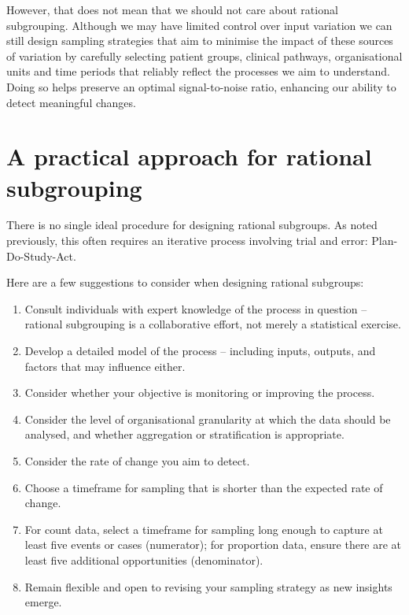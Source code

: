 \documentclass[
]{book}
\begin{document}
However, that does not mean that we should not care about rational subgrouping. Although we may have limited control over input variation we can still design sampling strategies that aim to minimise the impact of these sources of variation by carefully selecting patient groups, clinical pathways, organisational units and time periods that reliably reflect the processes we aim to understand. Doing so helps preserve an optimal signal-to-noise ratio, enhancing our ability to detect meaningful changes.

\section{A practical approach for rational subgrouping}\label{a-practical-approach-for-rational-subgrouping}

There is no single ideal procedure for designing rational subgroups. As noted previously, this often requires an iterative process involving trial and error: Plan-Do-Study-Act.

Here are a few suggestions to consider when designing rational subgroups:

\begin{enumerate}
\def\labelenumi{\arabic{enumi}.}
\item
  Consult individuals with expert knowledge of the process in question -- rational subgrouping is a collaborative effort, not merely a statistical exercise.
\item
  Develop a detailed model of the process -- including inputs, outputs, and factors that may influence either.
\item
  Consider whether your objective is monitoring or improving the process.
\item
  Consider the level of organisational granularity at which the data should be analysed, and whether aggregation or stratification is appropriate.
\item
  Consider the rate of change you aim to detect.
\item
  Choose a timeframe for sampling that is shorter than the expected rate of change.
\item
  For count data, select a timeframe for sampling long enough to capture at least five events or cases (numerator); for proportion data, ensure there are at least five additional opportunities (denominator).
\item
  Remain flexible and open to revising your sampling strategy as new insights emerge.
\end{enumerate}
\end{document}
